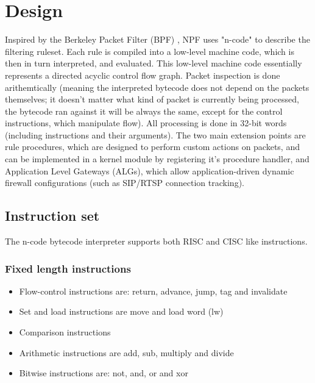 \documentclass[11pt,twocolumn]{article}
\begin{document}
\section{Design}
Inspired by the Berkeley Packet Filter (BPF) \cite{BPF}, NPF uses "n-code" to describe the filtering ruleset.
Each rule is compiled into a low-level machine code, which is then in turn interpreted, and evaluated.
This low-level machine code essentially represents a directed acyclic control flow graph. Packet inspection
is done arithemtically (meaning the interpreted bytecode does not depend on the packets themselves; it doesn't
matter what kind of packet is currently being processed, the bytecode ran against it will be always the same,
except for the control instructions, which manipulate flow). All processing is done in 32-bit words (including
instructions and their arguments).
The two main extension points are rule procedures, which are designed to perform custom actions
on packets, and can be implemented in a kernel module by registering it's procedure handler, and
Application Level Gateways (ALGs), which allow application-driven dynamic firewall configurations
(such as SIP/RTSP connection tracking).
\subsection{Instruction set}
The n-code bytecode interpreter supports both RISC and CISC like instructions. \cite{instr}
\subsubsection{Fixed length instructions}
\begin{itemize}
	\item Flow-control instructions are: return, advance, jump, tag and invalidate
	\item Set and load instructions are move and load word (lw)
	\item Comparison instructions
	\item Arithmetic instructions are add, sub, multiply and divide
	\item Bitwise instructions are: not, and, or and xor
\end{itemize}
\end{document}
